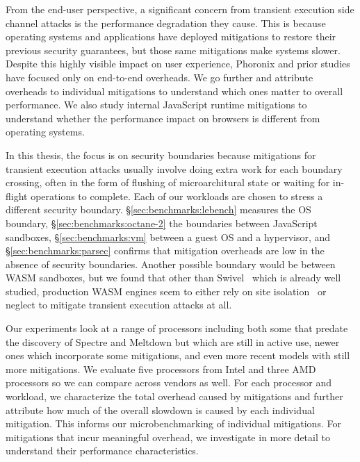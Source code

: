 
From the end-user perspective, a significant concern from transient execution side channel attacks is the performance degradation they cause.
This is because operating systems and applications have deployed mitigations to restore their previous security guarantees, but those same mitigations make systems slower.
Despite this highly visible impact on user experience, Phoronix and prior studies have focused only on end-to-end overheads.
We go further and attribute overheads to individual mitigations to understand which ones matter to overall performance.
We also study internal JavaScript runtime mitigations to understand whether the performance impact on browsers is different from operating systems. 

In this thesis, the focus is on security boundaries because mitigations for transient execution attacks usually involve doing extra work for each boundary crossing, often in the form of flushing of microarchitural state or waiting for in-flight operations to complete.
Each of our workloads are chosen to stress a different security boundary.
\S\ref{sec:benchmarks:lebench} measures the OS boundary, \S\ref{sec:benchmarks:octane-2} the boundaries between JavaScript sandboxes, \S\ref{sec:benchmarks:vm} between a guest OS and a hypervisor, and \S\ref{sec:benchmarks:parsec} confirms that mitigation overheads are low in the absence of security boundaries.
Another possible boundary would be between WASM sandboxes, but we found that other than Swivel~\cite{narayan:swivel} which is already well studied, production WASM engines seem to either rely on site isolation~\cite{reis:site-isolation} or neglect to mitigate transient execution attacks at all.

Our experiments look at a range of processors including both some that predate the discovery of Spectre and Meltdown but which are still in active use, newer ones which incorporate some mitigations, and even more recent models with still more mitigations.
We evaluate five processors from Intel and three AMD processors so we can compare across vendors as well.
For each processor and workload, we characterize the total overhead caused by mitigations and further attribute how much of the overall slowdown is caused by each individual mitigation.
This informs our microbenchmarking of individual mitigations.
For mitigations that incur meaningful overhead, we investigate in more detail to understand their performance characteristics.

